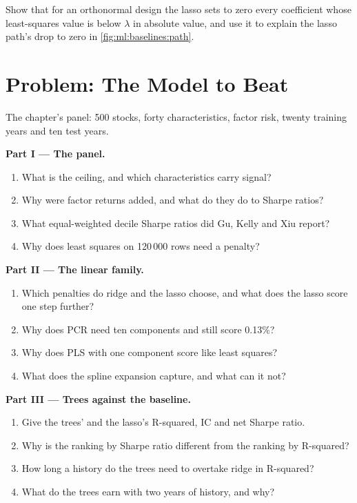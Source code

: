 \begin{exercise}[$\star\star\star$]\label{exo:ml:linear-and-regularised-baselines:8}
Show that for an orthonormal design the lasso sets to zero every coefficient whose least-squares value is below
$\lambda$ in absolute value, and use it to explain the lasso path's drop to zero in \cref{fig:ml:baselines:path}.
\end{exercise}

\section{Problem: The Model to Beat}

\begin{problem}\label{pb:ml:linear-and-regularised-baselines:1}
The chapter's panel: 500 stocks, forty characteristics, factor risk, twenty training years and ten test years.

\medskip\noindent\textbf{Part I --- The panel.}
\begin{enumerate}
\item What is the ceiling, and which characteristics carry signal?
\item Why were factor returns added, and what do they do to Sharpe ratios?
\item What equal-weighted decile Sharpe ratios did Gu, Kelly and Xiu report?
\item Why does least squares on 120\,000 rows need a penalty?
\end{enumerate}

\medskip\noindent\textbf{Part II --- The linear family.}
\begin{enumerate}[resume]
\item Which penalties do ridge and the lasso choose, and what does the lasso score one step further?
\item Why does PCR need ten components and still score 0.13\%?
\item Why does PLS with one component score like least squares?
\item What does the spline expansion capture, and what can it not?
\end{enumerate}

\medskip\noindent\textbf{Part III --- Trees against the baseline.}
\begin{enumerate}[resume]
\item Give the trees' and the lasso's R-squared, IC and net Sharpe ratio.
\item Why is the ranking by Sharpe ratio different from the ranking by R-squared?
\item How long a history do the trees need to overtake ridge in R-squared?
\item What do the trees earn with two years of history, and why?
\end{enumerate}


\end{problem}
